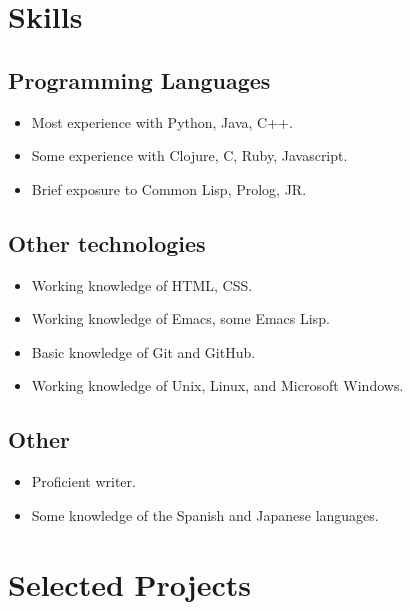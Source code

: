 \documentclass[12pt]{article}
\begin{document}
\section*{Skills}
\label{sec-3}
\subsection*{Programming Languages}
\label{sec-3-1}

\begin{itemize}
\item Most experience with Python, Java, C++.
\item Some experience with Clojure, C, Ruby, Javascript.
\item Brief exposure to Common Lisp, Prolog, JR.
\end{itemize}
\subsection*{Other technologies}
\label{sec-3-2}

\begin{itemize}
\item Working knowledge of HTML, CSS.
\item Working knowledge of Emacs, some Emacs Lisp.
\item Basic knowledge of Git and GitHub.
\item Working knowledge of Unix, Linux, and Microsoft Windows.
\end{itemize}
\subsection*{Other}
\label{sec-3-3}

\begin{itemize}
\item Proficient writer.
\item Some knowledge of the Spanish and Japanese languages.
\end{itemize}
\section*{Selected Projects}
\label{sec-4}
\end{document}
